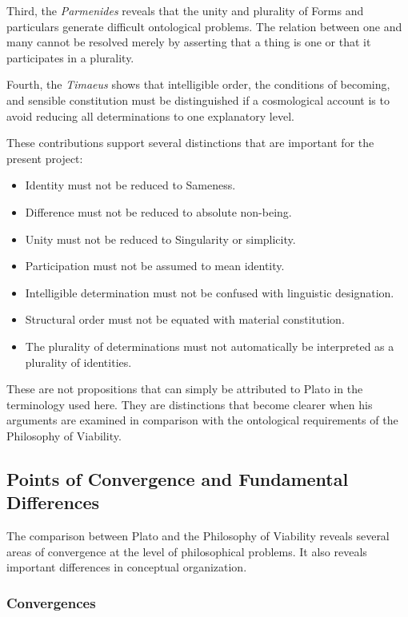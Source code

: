Third, the \textit{Parmenides} reveals that the unity and plurality
of Forms and particulars generate difficult ontological problems.
The relation between one and many cannot be resolved merely by
asserting that a thing is one or that it participates in a plurality.

Fourth, the \textit{Timaeus} shows that intelligible order, the
conditions of becoming, and sensible constitution must be
distinguished if a cosmological account is to avoid reducing
all determinations to one explanatory level.

These contributions support several distinctions that are
important for the present project:

\begin{itemize}
    \item Identity must not be reduced to Sameness.
    \item Difference must not be reduced to absolute non-being.
    \item Unity must not be reduced to Singularity or simplicity.
    \item Participation must not be assumed to mean identity.
    \item Intelligible determination must not be confused with
    linguistic designation.
    \item Structural order must not be equated with material
    constitution.
    \item The plurality of determinations must not automatically
    be interpreted as a plurality of identities.
\end{itemize}

These are not propositions that can simply be attributed to Plato
in the terminology used here. They are distinctions that become
clearer when his arguments are examined in comparison with the
ontological requirements of the Philosophy of Viability.

\subsection{Points of Convergence and Fundamental Differences}

The comparison between Plato and the Philosophy of Viability reveals
several areas of convergence at the level of philosophical problems.
It also reveals important differences in conceptual organization.

\subsubsection{Convergences}

